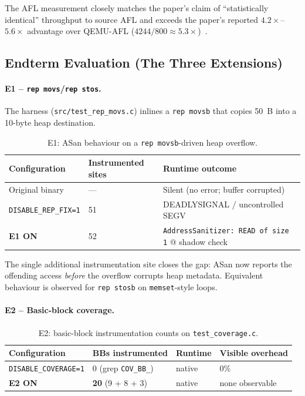 \documentclass[10pt,a4paper]{article}
\begin{document}
The AFL measurement closely matches the paper's claim of ``statistically
identical'' throughput to source AFL and exceeds the paper's reported
$4.2\times$--$5.6\times$ advantage over QEMU-AFL ($4244/800 \approx
5.3\times$)~\cite{retrowrite}.

\subsection{Endterm Evaluation (The Three Extensions)}

\paragraph{E1 -- \texttt{rep movs}/\texttt{rep stos}.} The harness
(\texttt{src/test\_rep\_movs.c}) inlines a \texttt{rep movsb} that copies
50~B into a 10-byte heap destination.

\begin{table}[H]
\centering
\caption{E1: ASan behaviour on a \texttt{rep movsb}-driven heap overflow.}
\label{tab:e1}
\footnotesize
\begin{tabular}{p{3.5cm}p{4.0cm}p{6.5cm}}
\toprule
\textbf{Configuration} & \textbf{Instrumented sites} & \textbf{Runtime outcome} \\
\midrule
\rowcolor{danger!8} Original binary & --- & Silent (no error; buffer corrupted) \\
\rowcolor{rowgray} \texttt{DISABLE\_REP\_FIX=1} & 51 & \textcolor{danger}{DEADLYSIGNAL / uncontrolled SEGV} \\
\rowcolor{success!8} \textbf{E1 ON} & 52 & \textcolor{success}{\texttt{AddressSanitizer: READ of size 1} @ shadow check} \\
\bottomrule
\end{tabular}
\end{table}

The single additional instrumentation site closes the gap: ASan now reports
the offending access \emph{before} the overflow corrupts heap metadata.
Equivalent behaviour is observed for \texttt{rep stosb} on
\texttt{memset}-style loops.

\paragraph{E2 -- Basic-block coverage.}

\begin{table}[H]
\centering
\caption{E2: basic-block instrumentation counts on \texttt{test\_coverage.c}.}
\label{tab:e2}
\footnotesize
\begin{tabular}{p{3.5cm}p{3.0cm}p{2.5cm}p{5.0cm}}
\toprule
\textbf{Configuration} & \textbf{BBs instrumented} & \textbf{Runtime} & \textbf{Visible overhead} \\
\midrule
\rowcolor{rowgray} \texttt{DISABLE\_COVERAGE=1} & 0 (grep \texttt{COV\_BB\_}) & native & 0\% \\
\rowcolor{success!8} \textbf{E2 ON} & \textbf{20} (9 + 8 + 3) & native & none observable \\
\bottomrule
\end{tabular}
\end{table}
\end{document}
